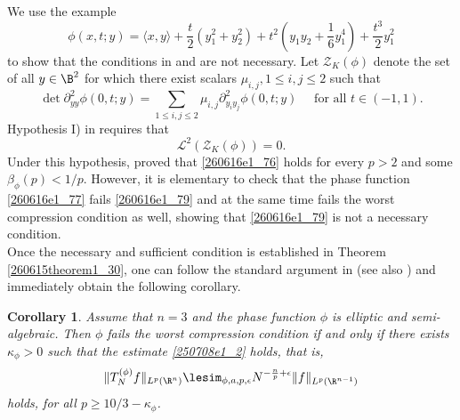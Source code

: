 \documentclass{article}
\numberwithin{equation}{section}
\theoremstyle{plain}
\newtheorem{corollary}[theorem]{Corollary}
\begin{document}
We use the example 
\begin{equation}\label{260616e1_77}
\phi(x, t; y)=
\langle x, y\rangle+
\frac{t}{2}\left(y_1^2+y_2^2\right)+t^2\left(y_1 y_2+\frac{1}{6} y_1^4\right)+\frac{t^3}{2} y_1^2
\end{equation}
to show that the conditions in \cite{Bou91} and  \cite{CGGHIW24} are not necessary. 
Let $\mathcal{Z}_K(\phi)$ denote the set of all  $y\in \B^2$ for which there exist scalars $\mu_{i, j}, 1\le i, j\le 2$ such that 
\begin{equation}
\operatorname{det} \partial_{y y}^2 \phi(0, t ; y)=\sum_{1 \leq i, j \leq 2} \mu_{i, j} \partial_{y_i y_j}^2 \phi(0, t ; y) \quad \text { for all } t \in(-1,1) .
\end{equation}
Hypothesis I)  in \cite[Definition 2.2]{CGGHIW24} requires that 
\begin{equation}\label{260616e1_79}
\mathcal{L}^2(\mathcal{Z}_K(\phi))=0.
\end{equation}
Under this hypothesis, \cite{CGGHIW24} proved that \eqref{260616e1_76} holds for every $p>2$ and some $\beta_{\phi}(p)< 1/p$. However, it is elementary to check that the phase function \eqref{260616e1_77} fails \eqref{260616e1_79} and at the same time fails the worst compression condition as well, showing that \eqref{260616e1_79} is not a necessary condition. \\




Once the necessary and sufficient condition is established in Theorem \ref{260615theorem1_30}, one can follow the standard  argument in \cite[Section 5]{Bou91} (see also \cite[Proposition 2.10]{CGGHIW24}) and immediately obtain the following corollary. 



\begin{corollary}\label{260617corollary1_31}
    Assume that $n=3$ and the phase function $\phi$ is elliptic and semi-algebraic. Then $\phi$ fails the worst compression condition if and only if there exists $\kappa_{\phi}>0$ such that the estimate \eqref{250708e1_2} holds, that is, 
    \begin{equation}
        \|T^{(\phi)}_N f\|_{L^p(\R^n)}\lesim_{\phi, a, p, \epsilon} N^{-\frac{n}{p}+\epsilon} \|f\|_{L^p(\R^{n-1})}
    \end{equation}
    holds, 
    for all 
$p\ge 10/3-\kappa_{\phi}$. 
\end{corollary}
\end{document}
